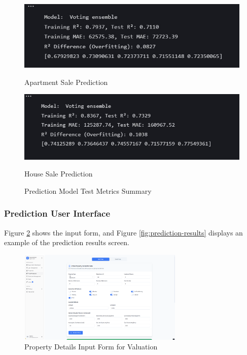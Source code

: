 \begin{figure}[htbp]
    \begin{minipage}{0.48\textwidth}
        \centering
        \includegraphics[width=\linewidth]{images/apartmeent vente.jpeg}
        \caption*{Apartment Sale Prediction}
    \end{minipage}
    \hfill
    \begin{minipage}{0.48\textwidth}
        \centering
        \includegraphics[width=\linewidth]{images/maison vente.jpeg}
        \caption*{House Sale Prediction}
    \end{minipage}
    
    \caption{Prediction Model Test Metrics Summary}
    \label{fig:model-test-metrics}
\end{figure}
\newpage

\subsubsection{Prediction User Interface}
Figure \ref{fig:prediction-form} shows the input form, and Figure \ref{fig:prediction-results} displays an example of the prediction results screen.

\begin{figure}[htbp]
        \centering
        \includegraphics[width=0.7\textwidth]{images/screenshot_form_predition.png}
        \caption{Property Details Input Form for Valuation}
        \label{fig:prediction-form}
\end{figure}

